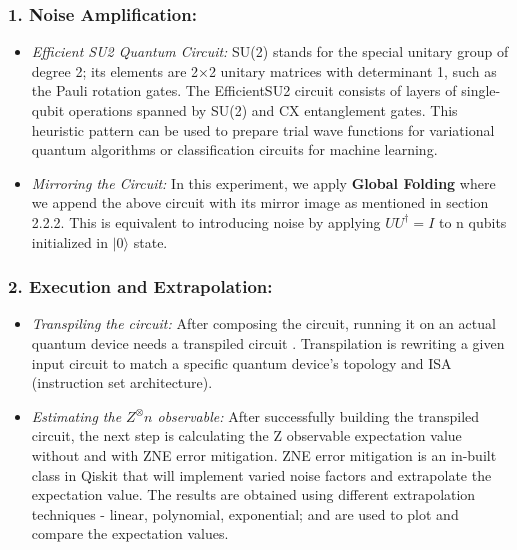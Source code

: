 \documentclass[12pt]{article}
\begin{document}
\subsubsection*{1. Noise Amplification:}
    
    \begin{itemize}
        \item \textit{Efficient SU2 Quantum Circuit:} SU(2) stands for the special unitary group of degree 2; its elements are 2×2 unitary matrices with determinant 1, such as the Pauli rotation gates. The EfficientSU2 circuit consists of layers of single-qubit operations spanned by SU(2) and CX entanglement gates. This heuristic pattern can be used to prepare trial wave functions for variational quantum algorithms or classification circuits for machine learning. 
        
        \item \textit{Mirroring the Circuit:} In this experiment, we apply \textbf{Global Folding} where we append the above circuit with its mirror image as mentioned in section 2.2.2. This is equivalent to introducing noise by applying $UU^\dagger = I$ to n qubits initialized in $|0\rangle$ state.         
    \end{itemize}

    \subsubsection*{2. Execution and Extrapolation:}
    \begin{itemize}
        \item \textit{Transpiling the circuit:} After composing the circuit, running it on an actual quantum device needs a transpiled circuit \cite{ibm_transpilation}. Transpilation is rewriting a given input circuit to match a specific quantum device's topology and ISA (instruction set architecture).
        
        \item \textit{Estimating the $Z^\otimes n$ observable:} After successfully building the transpiled circuit, the next step is calculating the Z observable expectation value without and with ZNE error mitigation. ZNE error mitigation is an in-built class in Qiskit that will implement varied noise factors and extrapolate the expectation value. The results are obtained using different extrapolation techniques - linear, polynomial, exponential; and are used to plot and compare the expectation values.
    \end{itemize}
\end{document}
